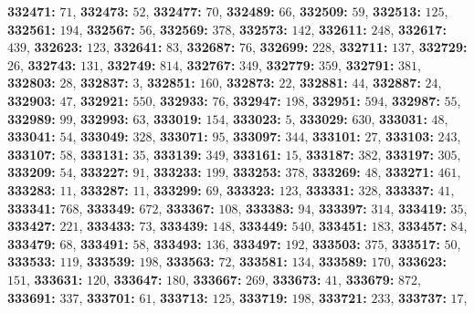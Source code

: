 \textsf{\bfseries 332471:} $71$, \textsf{\bfseries 332473:} $52$, \textsf{\bfseries 332477:} $70$, \textsf{\bfseries 332489:} $66$, \textsf{\bfseries 332509:} $59$, \textsf{\bfseries 332513:} $125$, \textsf{\bfseries 332561:} $194$, \textsf{\bfseries 332567:} $56$, \textsf{\bfseries 332569:} $378$, \textsf{\bfseries 332573:} $142$, \textsf{\bfseries 332611:} $248$, \textsf{\bfseries 332617:} $439$, \textsf{\bfseries 332623:} $123$, \textsf{\bfseries 332641:} $83$, \textsf{\bfseries 332687:} $76$, \textsf{\bfseries 332699:} $228$, \textsf{\bfseries 332711:} $137$, \textsf{\bfseries 332729:} $26$, \textsf{\bfseries 332743:} $131$, \textsf{\bfseries 332749:} $814$, \textsf{\bfseries 332767:} $349$, \textsf{\bfseries 332779:} $359$, \textsf{\bfseries 332791:} $381$, \textsf{\bfseries 332803:} $28$, \textsf{\bfseries 332837:} $3$, \textsf{\bfseries 332851:} $160$, \textsf{\bfseries 332873:} $22$, \textsf{\bfseries 332881:} $44$, \textsf{\bfseries 332887:} $24$, \textsf{\bfseries 332903:} $47$, \textsf{\bfseries 332921:} $550$, \textsf{\bfseries 332933:} $76$, \textsf{\bfseries 332947:} $198$, \textsf{\bfseries 332951:} $594$, \textsf{\bfseries 332987:} $55$, \textsf{\bfseries 332989:} $99$, \textsf{\bfseries 332993:} $63$, \textsf{\bfseries 333019:} $154$, \textsf{\bfseries 333023:} $5$, \textsf{\bfseries 333029:} $630$, \textsf{\bfseries 333031:} $48$, \textsf{\bfseries 333041:} $54$, \textsf{\bfseries 333049:} $328$, \textsf{\bfseries 333071:} $95$, \textsf{\bfseries 333097:} $344$, \textsf{\bfseries 333101:} $27$, \textsf{\bfseries 333103:} $243$, \textsf{\bfseries 333107:} $58$, \textsf{\bfseries 333131:} $35$, \textsf{\bfseries 333139:} $349$, \textsf{\bfseries 333161:} $15$, \textsf{\bfseries 333187:} $382$, \textsf{\bfseries 333197:} $305$, \textsf{\bfseries 333209:} $54$, \textsf{\bfseries 333227:} $91$, \textsf{\bfseries 333233:} $199$, \textsf{\bfseries 333253:} $378$, \textsf{\bfseries 333269:} $48$, \textsf{\bfseries 333271:} $461$, \textsf{\bfseries 333283:} $11$, \textsf{\bfseries 333287:} $11$, \textsf{\bfseries 333299:} $69$, \textsf{\bfseries 333323:} $123$, \textsf{\bfseries 333331:} $328$, \textsf{\bfseries 333337:} $41$, \textsf{\bfseries 333341:} $768$, \textsf{\bfseries 333349:} $672$, \textsf{\bfseries 333367:} $108$, \textsf{\bfseries 333383:} $94$, \textsf{\bfseries 333397:} $314$, \textsf{\bfseries 333419:} $35$, \textsf{\bfseries 333427:} $221$, \textsf{\bfseries 333433:} $73$, \textsf{\bfseries 333439:} $148$, \textsf{\bfseries 333449:} $540$, \textsf{\bfseries 333451:} $183$, \textsf{\bfseries 333457:} $84$, \textsf{\bfseries 333479:} $68$, \textsf{\bfseries 333491:} $58$, \textsf{\bfseries 333493:} $136$, \textsf{\bfseries 333497:} $192$, \textsf{\bfseries 333503:} $375$, \textsf{\bfseries 333517:} $50$, \textsf{\bfseries 333533:} $119$, \textsf{\bfseries 333539:} $198$, \textsf{\bfseries 333563:} $72$, \textsf{\bfseries 333581:} $134$, \textsf{\bfseries 333589:} $170$, \textsf{\bfseries 333623:} $151$, \textsf{\bfseries 333631:} $120$, \textsf{\bfseries 333647:} $180$, \textsf{\bfseries 333667:} $269$, \textsf{\bfseries 333673:} $41$, \textsf{\bfseries 333679:} $872$, \textsf{\bfseries 333691:} $337$, \textsf{\bfseries 333701:} $61$, \textsf{\bfseries 333713:} $125$, \textsf{\bfseries 333719:} $198$, \textsf{\bfseries 333721:} $233$, \textsf{\bfseries 333737:} $17$, 
